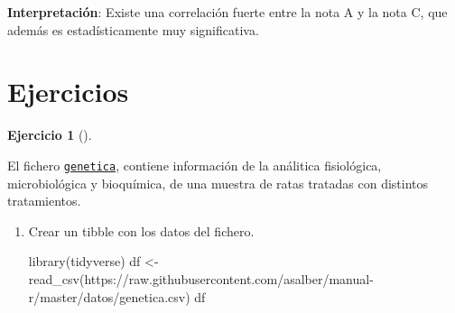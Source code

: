 \documentclass[
  spanish,
  a4paper,
]{scrreport}
\newenvironment{Shaded}{\begin{snugshade}}{\end{snugshade}}
\newcommand{\FunctionTok}[1]{\textcolor[rgb]{0.28,0.35,0.67}{#1}}
\newcommand{\NormalTok}[1]{\textcolor[rgb]{0.00,0.23,0.31}{#1}}
\newcommand{\OtherTok}[1]{\textcolor[rgb]{0.00,0.23,0.31}{#1}}
\newcommand{\StringTok}[1]{\textcolor[rgb]{0.13,0.47,0.30}{#1}}
\theoremstyle{definition}
\newtheorem{exercise}{Ejercicio}[chapter]
\theoremstyle{definition}
\theoremstyle{remark}
\begin{document}
\textbf{Interpretación}: Existe una correlación fuerte entre la nota A y
la nota C, que además es estadísticamente muy significativa.

\section{Ejercicios}\label{ejercicios-6}

\begin{exercise}[]\protect\hypertarget{exr-analisis-estadisticos-1}{}\label{exr-analisis-estadisticos-1}

El fichero
\href{https://raw.githubusercontent.com/asalber/manual-r/master/datos/genetica.csv}{\texttt{genetica}},
contiene información de la análitica fisiológica, microbiológica y
bioquímica, de una muestra de ratas tratadas con distintos tratamientos.

\begin{enumerate}
\def\labelenumi{\alph{enumi}.}
\item
  Crear un tibble con los datos del fichero.

  \begin{tcolorbox}[enhanced jigsaw, arc=.35mm, bottomrule=.15mm, bottomtitle=1mm, breakable, colback=white, colbacktitle=quarto-callout-note-color!10!white, colframe=quarto-callout-note-color-frame, coltitle=black, left=2mm, leftrule=.75mm, opacityback=0, opacitybacktitle=0.6, rightrule=.15mm, title=\textcolor{quarto-callout-note-color}{\faInfo}\hspace{0.5em}{Solución}, titlerule=0mm, toprule=.15mm, toptitle=1mm]

\begin{Shaded}
\begin{Highlighting}[]
\FunctionTok{library}\NormalTok{(tidyverse)}
\NormalTok{df }\OtherTok{\textless{}{-}} \FunctionTok{read\_csv}\NormalTok{(}\StringTok{\textquotesingle{}https://raw.githubusercontent.com/asalber/manual{-}r/master/datos/genetica.csv\textquotesingle{}}\NormalTok{)}
\NormalTok{df}
\end{Highlighting}
\end{Shaded}


\end{tcolorbox}
\end{enumerate}
\end{exercise}
\end{document}

